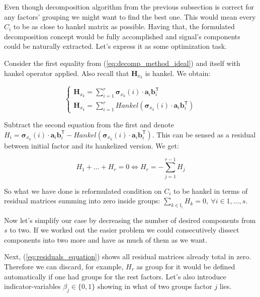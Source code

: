 	Even though decomposition algorithm from the previous subsection is correct for any factors' grouping we might want to find the best one. This would mean every $ C_i $ to be as close to hankel matrix as possible. Having that, the formulated decomposition concept would be fully accomplished and signal's components could be naturally extracted. Let's express it as some optimization task.
	
	Consider the first equality from (\ref{eq:decomp_method_ideal}) and itself with hankel operator applied. Also recall that $ \mathbf{H}_{x_k} $ is hankel. We obtain:
	
	\begin{equation*}
		\begin{cases*}
			\mathbf{H}_{x_k} = \sum\limits_{i = 1}^{r} \boldsymbol{\sigma}_{x_k}(i) \cdot \mathbf{a}_i  \mathbf{b}_i^{\mathsf{T}} \\
			\mathbf{H}_{x_k} = \sum\limits_{i = 1}^{r} Hankel(\boldsymbol{\sigma}_{x_k}(i) \cdot \mathbf{a}_i  \mathbf{b}_i^{\mathsf{T}})
		\end{cases*}
	\end{equation*}
	
	Subtract the second equation from the first and denote $ H_i = \boldsymbol{\sigma}_{x_k}(i) \cdot \mathbf{a}_i  \mathbf{b}_i^{\mathsf{T}} - Hankel(\boldsymbol{\sigma}_{x_k}(i) \cdot \mathbf{a}_i  \mathbf{b}_i^{\mathsf{T}}) $. This can be sensed as a residual between initial factor and its hankelized version. We get:
	
	\begin{equation}\label{eq:residuals_equation}
		H_1 + \ldots + H_r = 0 \Leftrightarrow H_r = - \sum\limits_{j = 1}^{r - 1} H_j
	\end{equation}
	
	So what we have done is reformulated condition on $ C_i $ to be hankel in terms of residual matrices summing into zero inside groups: $ \sum_{k \in \mathbb{I}_i} H_k = 0, \  \forall i \in 1, \ldots, s $.
	
	Now let's simplify our case by decreasing the number of desired components from $ s $ to two. If we worked out the easier problem we could consecutively dissect components into two more and have as much of them as we want.  
	
	Next, (\ref{eq:residuals_equation}) shows all residual matrices already total in zero. Therefore we can discard, for example, $ H_r $ as group for it would be defined automatically if one had groups for the rest factors. Let's also introduce indicator-variables $ \beta_j \in \{0, 1\} $ showing in what of two groups factor $ j $ lies.
	
